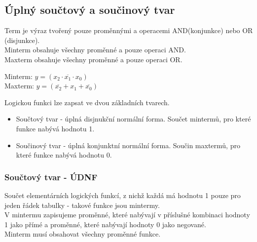 \subsection{Úplný součtový a součinový tvar}
Term je výraz tvořený pouze proměnnými a operacemi AND(konjunkce) nebo OR (disjunkce).\\
Minterm obsahuje všechny proměnné a pouze operaci AND.\\
Maxterm obsahuje všechny proměnné a pouze operaci OR.
\begin{center}
    Minterm: \(y = (x_2 \cdot \overline{x_1} \cdot x_0)\)\\
    Maxterm: \(y = (\overline{x_2} + x_1 + \overline{x_0})\)
\end{center}

Logickou funkci lze zapsat ve dvou základních tvarech.\\
\begin{itemize}
    \item Součtový tvar - úplná disjnukční normální forma. Součet mintermů, pro které funkce nabývá hodnotu 1.
    \item Součinový tvar - úplná konjunktní normální forma. Součin maxtermů, pro které funkce nabývá hodnotu 0.
\end{itemize}

\subsubsection{Součtový tvar - ÚDNF}
Součet elementárních logických funkcí, z nichž každá má hodnotu 1 pouze pro jeden řádek tabulky - takové funkce jsou mintermy.\\
V mintermu zapisujeme proměnné, které nabývají v příslušné kombinaci hodnoty 1 jako přímé a proměnné, které nabývají hodnoty 0 jako negované.\\
Minterm musí obsahovat všechny proměnné funkce.\\

